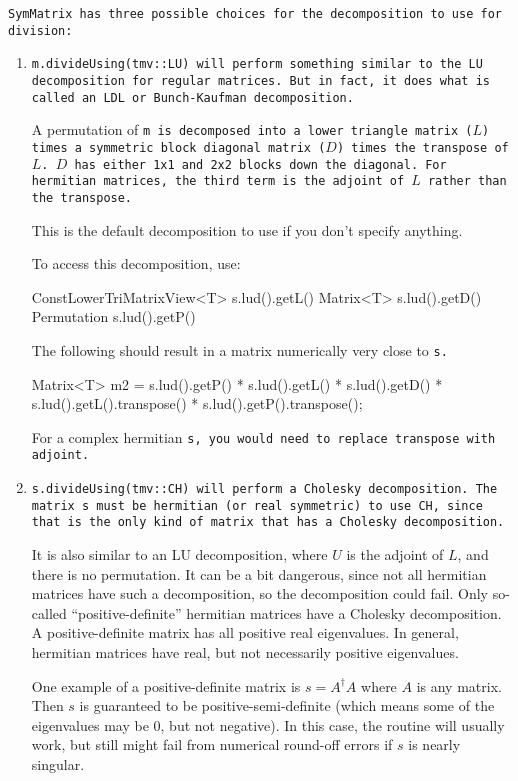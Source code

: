 \tt{SymMatrix} has three possible choices for the decomposition to use for division:
\begin{enumerate}
\item
\tt{m.divideUsing(tmv::LU)} will perform something similar to the LU decomposition
for regular matrices.  But in fact, it does what is called an LDL or Bunch-Kaufman
decomposition.  

A permutation of \tt{m} is decomposed into a lower triangle matrix ($L$)
times a symmetric block diagonal matrix ($D$) times the transpose of $L$.
$D$ has either 1x1 and 2x2 blocks down the diagonal.  For hermitian matrices,
the third term is the adjoint of $L$ rather than the transpose.

This is the default decomposition to use if you don't specify anything.

To access this decomposition, use:
\begin{tmvcode}
ConstLowerTriMatrixView<T> s.lud().getL()
Matrix<T> s.lud().getD()
Permutation s.lud().getP()
\end{tmvcode}
The following should result in a matrix numerically very close to \tt{s}.
\begin{tmvcode}
Matrix<T> m2 = s.lud().getP() * s.lud().getL() * s.lud().getD() * 
      s.lud().getL().transpose() * s.lud().getP().transpose();
\end{tmvcode}
For a complex hermitian \tt{s}, you would need to replace
\tt{transpose} with \tt{adjoint}.

\item
\tt{s.divideUsing(tmv::CH)} will perform a Cholesky decomposition.  
The matrix \tt{s} must be hermitian (or real symmetric) to use \tt{CH}, since that is the
only kind of matrix that has a Cholesky decomposition.  

It is also similar to an 
LU decomposition, where $U$ is the adjoint of $L$, and there is no permutation.
It can be a bit dangerous, since not all hermitian matrices have such a decomposition,
so the decomposition could fail.  Only so-called ``positive-definite'' hermitian 
matrices have a Cholesky decomposition.  A positive-definite matrix has
all positive real eigenvalues.  In general, hermitian matrices have real, but
not necessarily positive eigenvalues.  

One example of a 
positive-definite matrix is $s = A^\dagger A$ where $A$ is any matrix.   
Then $s$ is guaranteed to be positive-semi-definite
(which means some of the eigenvalues may be 0, but not negative).
In this case, the routine will usually work, but still might fail from 
numerical round-off errors if $s$ is nearly singular.  


\end{enumerate}
